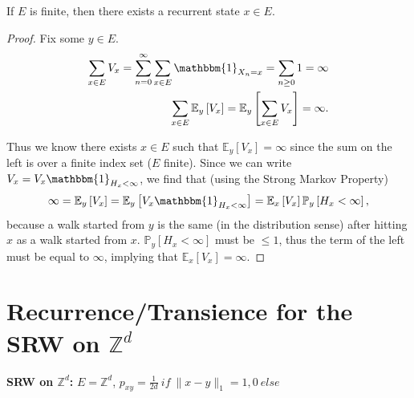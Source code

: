 \begin{prop}[]
	If $E$ is finite, then there exists a recurrent state $x \in E$.
\end{prop}
\begin{proof}
	Fix some $y \in E$.
	\begin{align}
		\sum_{x \in E}^{} V_x = \sum_{n=0}^{\infty} \sum_{x \in E}^{} \mathbbm{1}_{X_n =x} = \sum_{n\geq 0}^{} 1  = \infty \\
	\sum_{x \in E}^{} \mathbb{E}_{y} \left[ V_x \right] = \mathbb{E}_{y} \left[ \sum_{x \in E}^{} V_x \right] = \infty 
.	\end{align}

	Thus we know there exists $x \in E$ such that $\mathbb{E}_{y} \left[ V_x \right] = \infty$ since the sum on the left is over a finite index set ($E$ finite). Since we can write $V_x = V_x \mathbbm{1}_{H_x<\infty}$, we find that (using the Strong Markov Property) 
\begin{align}
	\infty = \mathbb{E}_{y} \left[ V_x \right] = \mathbb{E}_{y} \left[ V_x \mathbbm{1}_{H_x<\infty}  \right] = \mathbb{E}_{x} \left[ V_x \right] \mathbb{P}_{y} \left[ H_x < \infty \right] 
,\end{align}
	 because a walk started from $y$ is the same (in the distribution sense) after hitting $x$ as a walk started from $x$. $\mathbb{P}_{y} \left[ H_x < \infty \right]$ must be $ \leq 1 $, thus the term of the left must be equal to $\infty$, implying that $\mathbb{E}_{x} \left[ V_x \right] = \infty$.
\end{proof}


\section{Recurrence/Transience for the SRW on $\mathbb{Z}^d$}
\textbf{SRW on $\mathbb{Z}^d$:} $E=\mathbb{Z}^d$, $p_{xy}=\frac{1}{2d}\ if\ \|x-y\|_1=1, 0\ else$ 

